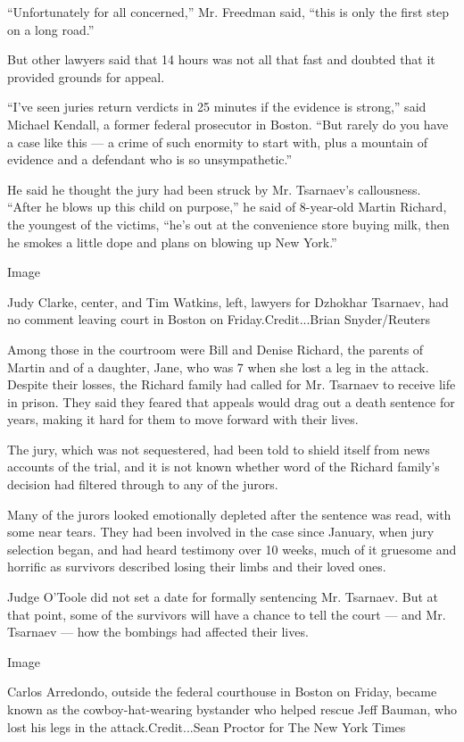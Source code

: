 ``Unfortunately for all concerned,'' Mr. Freedman said, ``this is only
the first step on a long road.''

But other lawyers said that 14 hours was not all that fast and doubted
that it provided grounds for appeal.

``I've seen juries return verdicts in 25 minutes if the evidence is
strong,'' said Michael Kendall, a former federal prosecutor in Boston.
``But rarely do you have a case like this --- a crime of such enormity
to start with, plus a mountain of evidence and a defendant who is so
unsympathetic.''

He said he thought the jury had been struck by Mr. Tsarnaev's
callousness. ``After he blows up this child on purpose,'' he said of
8-year-old Martin Richard, the youngest of the victims, ``he's out at
the convenience store buying milk, then he smokes a little dope and
plans on blowing up New York.''

Image

Judy Clarke, center, and Tim Watkins, left, lawyers for Dzhokhar
Tsarnaev, had no comment leaving court in Boston on
Friday.Credit...Brian Snyder/Reuters

Among those in the courtroom were Bill and Denise Richard, the parents
of Martin and of a daughter, Jane, who was 7 when she lost a leg in the
attack. Despite their losses, the Richard family had called for Mr.
Tsarnaev to receive life in prison. They said they feared that appeals
would drag out a death sentence for years, making it hard for them to
move forward with their lives.

The jury, which was not sequestered, had been told to shield itself from
news accounts of the trial, and it is not known whether word of the
Richard family's decision had filtered through to any of the jurors.

Many of the jurors looked emotionally depleted after the sentence was
read, with some near tears. They had been involved in the case since
January, when jury selection began, and had heard testimony over 10
weeks, much of it gruesome and horrific as survivors described losing
their limbs and their loved ones.

Judge O'Toole did not set a date for formally sentencing Mr. Tsarnaev.
But at that point, some of the survivors will have a chance to tell the
court --- and Mr. Tsarnaev --- how the bombings had affected their
lives.

Image

Carlos Arredondo, outside the federal courthouse in Boston on Friday,
became known as the cowboy-hat-wearing bystander who helped rescue Jeff
Bauman, who lost his legs in the attack.Credit...Sean Proctor for The
New York Times

